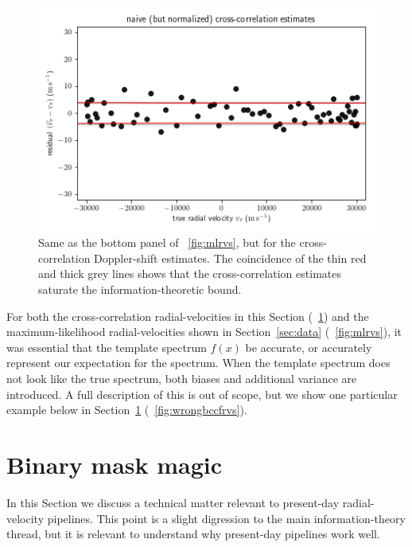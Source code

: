 \documentclass[modern]{aastex631}
\newcommand{\sectionname}{Section}
\newcommand{\secref}[1]{\sectionname~\ref{#1}}
\newcommand{\figref}[1]{\figurename~\ref{#1}}
\begin{document}
\begin{figure}[tp]
  \begin{mdframed}
    \begin{center}
    \includegraphics[width=\textwidth]{../notebook/ccfrvs.png}
    \end{center}
    \caption{Same as the bottom panel of \figref{fig:mlrvs}, but for the cross-correlation Doppler-shift estimates. The coincidence of the thin red and thick grey lines shows that the cross-correlation estimates saturate the information-theoretic bound.\label{fig:ccfrvs}}
  \end{mdframed}
\end{figure}

For both the cross-correlation radial-velocities in this \sectionname{} (\figref{fig:ccfrvs}) and the maximum-likelihood radial-velocities shown in \secref{sec:data} (\figref{fig:mlrvs}), it was essential that the template spectrum $f(x)$ be accurate, or accurately represent our expectation for the spectrum.
When the template spectrum does not look like the true spectrum, both biases and additional variance are introduced.
A full description of this is out of scope, but we show one particular example below in \secref{sec:binary} (\figref{fig:wrongbccfrvs}).

\section{Binary mask magic}\label{sec:binary}

In this \sectionname{} we discuss a technical matter relevant to present-day radial-velocity pipelines.
This point is a slight digression to the main information-theory thread, but it is relevant to understand why present-day pipelines work well.
\end{document}
